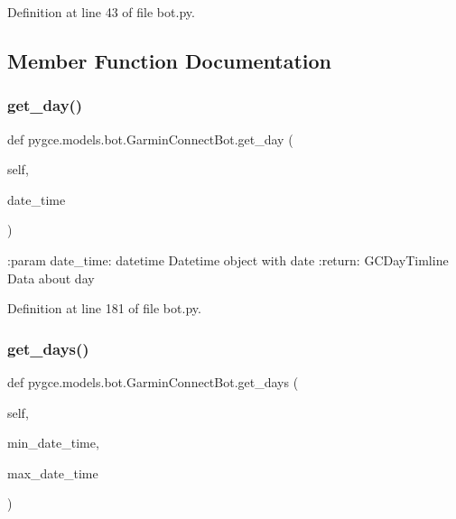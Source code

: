 Definition at line 43 of file bot.\+py.



\subsection{Member Function Documentation}
\mbox{\label{classpygce_1_1models_1_1bot_1_1_garmin_connect_bot_ab5ab1e855230273b7c7c085a461a3ed2}} 
\subsubsection{\texorpdfstring{get\+\_\+day()}{get\_day()}}
{\footnotesize\ttfamily def pygce.\+models.\+bot.\+Garmin\+Connect\+Bot.\+get\+\_\+day (\begin{DoxyParamCaption}\item[{}]{self,  }\item[{}]{date\+\_\+time }\end{DoxyParamCaption})}

\begin{DoxyVerb}:param date_time: datetime
    Datetime object with date
:return: GCDayTimline
    Data about day
\end{DoxyVerb}
 

Definition at line 181 of file bot.\+py.

\mbox{\label{classpygce_1_1models_1_1bot_1_1_garmin_connect_bot_a18ab2d80266a9da67186bcba6b4856b9}} 
\subsubsection{\texorpdfstring{get\+\_\+days()}{get\_days()}}
{\footnotesize\ttfamily def pygce.\+models.\+bot.\+Garmin\+Connect\+Bot.\+get\+\_\+days (\begin{DoxyParamCaption}\item[{}]{self,  }\item[{}]{min\+\_\+date\+\_\+time,  }\item[{}]{max\+\_\+date\+\_\+time }\end{DoxyParamCaption})}

